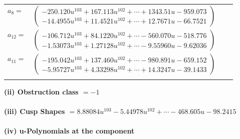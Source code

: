 \documentclass[1p]{elsarticle_modified}
\theoremstyle{definition}
\begin{document}
\begin{tabular}{m{7pt} m{180pt} m{7pt} m{180pt} }
\flushright $a_{8}=$&$\begin{pmatrix}-250.120 u^{103}+167.113 u^{102}+\cdots+1343.51 u-959.073\\-14.4955 u^{103}+11.4521 u^{102}+\cdots+12.7671 u-66.7521\end{pmatrix}$ \\
\flushright $a_{12}=$&$\begin{pmatrix}-106.712 u^{103}+84.1220 u^{102}+\cdots-560.070 u-518.776\\-1.53073 u^{103}+1.27128 u^{102}+\cdots-9.55960 u-9.62036\end{pmatrix}$ \\
\flushright $a_{11}=$&$\begin{pmatrix}-195.042 u^{103}+137.460 u^{102}+\cdots-980.891 u-659.152\\-5.95727 u^{103}+4.33298 u^{102}+\cdots+14.3247 u-39.1433\end{pmatrix}$\\&\end{tabular}
\flushleft \textbf{(ii) Obstruction class $= -1$}\\~\\
\flushleft \textbf{(iii) Cusp Shapes $= 8.88084 u^{103}-5.44978 u^{102}+\cdots-468.605 u-98.2415$}\\~\\
\newpage\renewcommand{\arraystretch}{1}
\flushleft \textbf{(iv) u-Polynomials at the component}\newline \\
\end{document}
